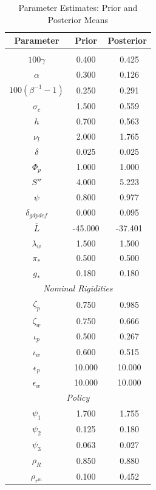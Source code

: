 \documentclass[12pt]{article}
\begin{document}
\pagestyle{empty}
\vspace*{.5cm}
\begin{longtable}{ccc}
\caption{Parameter Estimates: Prior and Posterior Means}
\\ \hline
Parameter & Prior & Posterior
\\ \hline
\endhead
\hline
\endfoot
\multicolumn{7}{c}{\textit{Steady State}} \\[3pt]
$ 100\gamma$ &    0.400 & \   0.425 \\
$ \alpha$ &    0.300 & \   0.126 \\
$ 100(\beta^{-1} - 1)$ &    0.250 & \   0.291 \\
$ \sigma_{c}$ &    1.500 & \   0.559 \\
$    h$ &    0.700 & \   0.563 \\
$ \nu_l$ &    2.000 & \   1.765 \\
$ \delta$ &    0.025 & \   0.025 \\
$ \Phi_p$ &    1.000 & \   1.000 \\
$  S''$ &    4.000 & \   5.223 \\
$ \psi$ &    0.800 & \   0.977 \\
$ \delta_{gdpdef}$ &    0.000 & \   0.095 \\
$ \bar{L}$ &  -45.000 & \ -37.401 \\
$ \lambda_w$ &    1.500 & \   1.500 \\
$ \pi_*$ &    0.500 & \   0.500 \\
$  g_*$ &    0.180 & \   0.180 \\
\multicolumn{7}{c}{\textit{Nominal Rigidities}} \\[3pt]
$ \zeta_p$ &    0.750 & \   0.985 \\
$ \zeta_w$ &    0.750 & \   0.666 \\
$ \iota_p$ &    0.500 & \   0.267 \\
$ \iota_w$ &    0.600 & \   0.515 \\
$ \epsilon_{p}$ &   10.000 & \  10.000 \\
$ \epsilon_{w}$ &   10.000 & \  10.000 \\
\multicolumn{7}{c}{\textit{Policy}} \\[3pt]
$ \psi_1$ &    1.700 & \   1.755 \\
$ \psi_2$ &    0.125 & \   0.180 \\
$ \psi_3$ &    0.063 & \   0.027 \\
$ \rho_R$ &    0.850 & \   0.880 \\
$ \rho_{r^m}$ &    0.100 & \   0.452 \\

\end{longtable}
\end{document}
